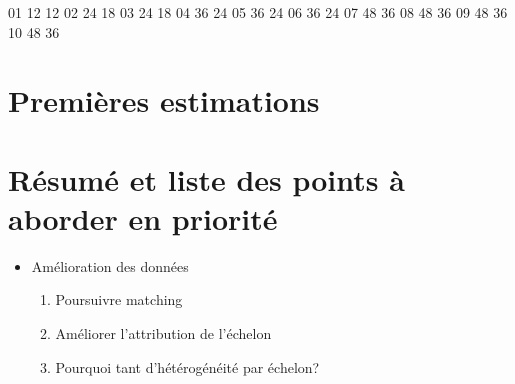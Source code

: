 \documentclass[11pt,a4paper]{article}
\begin{document}
01	12	12
02	24	18
03	24	18
04	36	24
05	36	24
06	36	24
07	48	36
08	48	36
09	48	36
10	48	36





\clearpage
\section{Premières estimations}



\clearpage
\section{Résumé et liste des points à aborder en priorité}


\begin{itemize}
\item Amélioration des données 
\begin{enumerate}
\item Poursuivre matching
\item Améliorer l'attribution de l'échelon
\item Pourquoi tant d'hétérogénéité par échelon? 
\end{enumerate}
\end{itemize}
\end{document}
